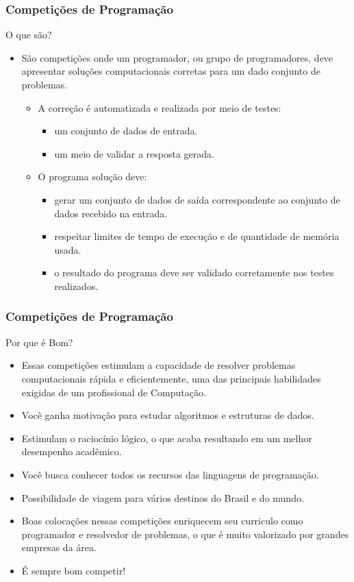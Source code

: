 \begin{frame}
\frametitle{Competições de Programação}
\begin{block}{O que são?}
\begin{itemize}
	\item São competições onde um programador, ou grupo de programadores, deve apresentar soluções computacionais corretas para um dado conjunto de problemas.
	\begin{itemize}
		\item A correção é automatizada e realizada por meio de testes:
		\begin{itemize}
			\item um conjunto de dados de entrada.
			\item um meio de validar a resposta gerada.
		\end{itemize}
		\item O programa solução deve:
		\begin{itemize}
			\item gerar um conjunto de dados de saída correspondente ao conjunto de dados recebido na entrada.
			\item respeitar limites de tempo de execução e de quantidade de memória usada.
			\item o resultado do programa deve ser validado corretamente nos testes realizados.
		\end{itemize}
	\end{itemize}
\end{itemize}
\end{block}
\end{frame}
\begin{frame}
\frametitle{Competições de Programação}
\begin{block}{Por que é Bom?}
\begin{itemize}
	\item Essas competições estimulam a capacidade de resolver problemas computacionais rápida e eficientemente, uma das principais habilidades exigidas de um profissional de Computação.
	\item Você ganha motivação para estudar algoritmos e estruturas de dados.
    \item Estimulam o raciocínio lógico, o que acaba resultando em um melhor desempenho acadêmico.
	\item Você busca conhecer todos os recursos das linguagens de programação.
	\item Possibilidade de viagem para vários destinos do Brasil e do mundo.
    \item Boas colocações nessas competições enriquecem seu curriculo como programador e resolvedor de problemas, o que é muito valorizado por grandes empresas da área.
	\item É sempre bom competir!
\end{itemize}
\end{block}
\end{frame}

